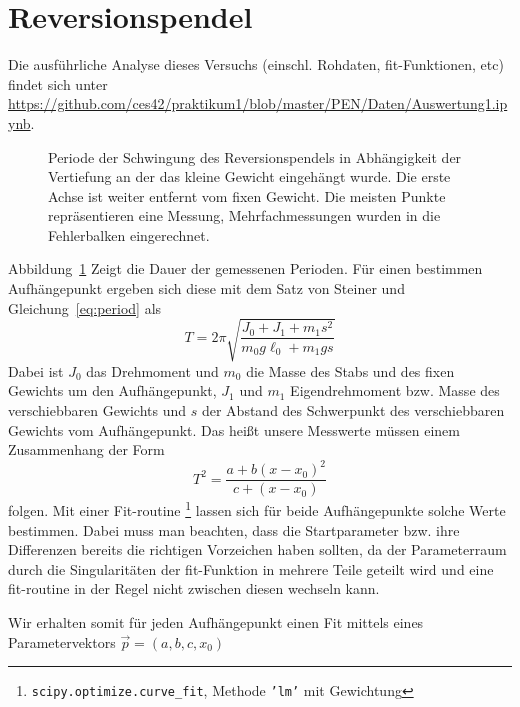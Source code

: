 \section{Reversionspendel}

Die ausführliche Analyse dieses Versuchs (einschl. Rohdaten, fit-Funktionen, etc) findet sich unter \url{https://github.com/ces42/praktikum1/blob/master/PEN/Daten/Auswertung1.ipynb}.
\\

\begin{figure}    
    \caption{Periode der Schwingung des Reversionspendels in Abhängigkeit der Vertiefung an der das kleine Gewicht eingehängt wurde. Die erste Achse ist weiter entfernt vom fixen Gewicht. Die meisten Punkte repräsentieren eine Messung, Mehrfachmessungen wurden in die Fehlerbalken eingerechnet.}
    \label{diag:rev}
\end{figure}

Abbildung~\ref{diag:rev} Zeigt die Dauer der gemessenen Perioden. Für einen bestimmen Aufhängepunkt ergeben sich diese mit dem Satz von Steiner und Gleichung~\ref{eq:period} als
\[
    T = 2 \pi \sqrt{\frac{J_0 + J_1 + m_1 s^2}{m_0 g \ell_0 + m_1 g s}}
\]
Dabei ist $J_0$ das Drehmoment und $m_0$ die Masse des Stabs und des fixen Gewichts um den Aufhängepunkt, $J_1$ und $m_1$ Eigendrehmoment bzw. Masse des verschiebbaren Gewichts und $s$ der Abstand des Schwerpunkt des verschiebbaren Gewichts vom Aufhängepunkt. Das heißt unsere Messwerte müssen einem Zusammenhang der Form
\[
    T^2 = \frac{a + b (x - x_0)^2}{c + (x - x_0)}
\]
folgen. Mit einer Fit-routine%
\footnote{\texttt{scipy.optimize.curve\_fit}, Methode \texttt{'lm'} mit Gewichtung}
lassen sich für beide Aufhängepunkte solche Werte bestimmen. Dabei muss man beachten, dass die Startparameter bzw. ihre Differenzen bereits die richtigen Vorzeichen haben sollten, da der Parameterraum durch die Singularitäten der fit-Funktion in mehrere Teile geteilt wird und eine fit-routine in der Regel nicht zwischen diesen wechseln kann.

Wir erhalten somit für jeden Aufhängepunkt einen Fit mittels eines Parametervektors $\vec{p} = (a, b, c, x_0)$
